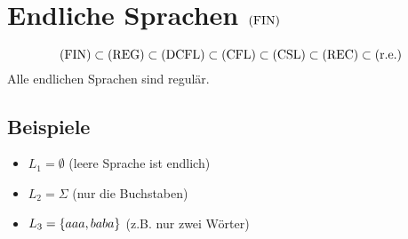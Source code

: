 \chapter{Endliche Sprachen $\mathrm{(FIN)}$}
\begin{equation*}
	\mathrm{(FIN)}\subset\mathrm{(REG)}\subset\mathrm{(DCFL)}\subset\mathrm{(CFL)}\subset\mathrm{(CSL)}\subset\mathrm{(REC)}\subset\mathrm{(r.e.)}
\end{equation*}
Alle endlichen Sprachen sind regulär.

\section{Beispiele}
\begin{itemize}
	\item $L_1=\emptyset$ (leere Sprache ist endlich)
	\item $L_2=\Sigma$ (nur die Buchstaben)
	\item $L_3=\left\{ aaa,baba \right\}$ (z.B. nur zwei Wörter)
\end{itemize}
